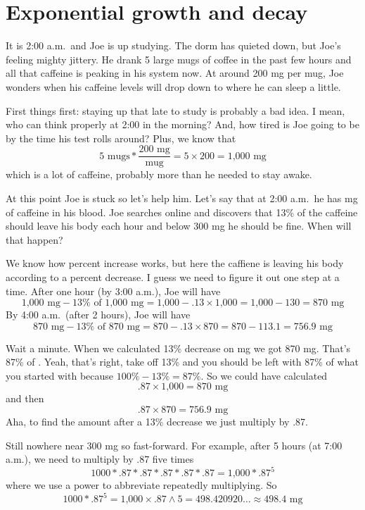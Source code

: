 \section{Exponential growth and decay}

It is 2:00 a.m.\ and Joe is up studying.  The dorm has quieted down, but Joe's feeling mighty jittery.  He  drank 5 large mugs of coffee in the past few hours and all that caffeine is peaking in his system now.  At around 200 mg per mug, Joe wonders when his caffeine levels will drop down to where he can sleep a little.  

First things first:  staying up that late to study is probably a bad idea.  I mean, who can think properly at 2:00 in the morning?  And, how tired is Joe going to be by the time his test rolls around?  Plus, we know that
$$5 \text{ mugs} \ast \frac{200 \text{ mg}}{\text{mug}} = 5 \times 200 = \text{1,000 mg}$$
which is a lot of caffeine, probably more than he needed to stay awake.  

At this point Joe is stuck so let's help him. Let's say that at 2:00 a.m.\ he has  mg of caffeine in his blood.  Joe searches online and discovers that 13\% of the caffeine should leave his body each hour and below 300 mg he should be fine.  When will that happen?

We know how percent increase works, but here the caffiene is leaving his body according to a percent decrease.  I guess we need to figure it out one step at a time.  After one hour (by 3:00 a.m.), Joe will have 
$$  \text{1,000} \text{ mg} - 13 \% \text{ of }  \text{1,000} \text{ mg} =  \text{1,000}- .13 \times  \text{1,000} =  \text{1,000} - 130 = 870 \text{ mg}$$
By 4:00 a.m.\ (after 2 hours), Joe will have
$$ 870 \text{ mg} - 13 \% \text{ of } 870 \text{ mg} = 870 - .13 \times 870 = 870 - 113.1 =  756.9 \text{ mg}$$

Wait a minute.  When we calculated 13\% decrease on   mg we got 870 mg.  That's 87\% of .  Yeah, that's right, take off 13\% and you should be left with 87\% of what you started with because $100\% - 13\% = 87\%$.
So we could have calculated 
$$ .87 \times \text{1,000} = 870 \text{ mg}$$
and then $$.87 \times 870 = 756.9 \text{ mg}$$
Aha, to find the amount after a 13\% decrease we just multiply by .87.

Still nowhere near 300 mg so fast-forward.  For example, after 5 hours (at 7:00 a.m.), we need to multiply   by .87 five times
$$1000 \ast .87 \ast .87 \ast .87 \ast .87 \ast .87=  \text{1,000} \ast .87^5$$
where we use a power to abbreviate repeatedly multiplying.  So
$$1000 \ast .87^5 =  \text{1,000} \times .87 \wedge 5 = 498.420920\ldots \approx 498.4 \text{ mg}$$

